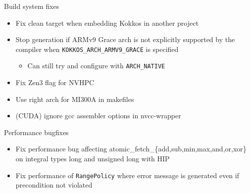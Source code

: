 \begin{frame}[fragile]{Build system fixes}
  \begin{itemize}
      \item Fix clean target when embedding Kokkos in another project
      \item Stop generation if ARMv9 Grace arch is not explicitly supported by the compiler when \texttt{KOKKOS\_ARCH\_ARMV9\_GRACE} is specified
      \begin{itemize}
        \item Can still try and configure with \texttt{ARCH\_NATIVE}
      \end{itemize}
      \item Fix Zen3 flag for NVHPC
      \item Use right arch for MI300A in makefiles
      \item (CUDA) ignore gcc assembler options in nvcc-wrapper
  \end{itemize}
 \end{frame}

\begin{frame}[fragile]{Performance bugfixes}
 \begin{itemize}
     \item Fix performance bug affecting atomic\_fetch\_\{add,sub,min,max,and,or,xor\} on integral types long and unsigned long with HIP
     \item Fix performance of \texttt{RangePolicy} where error message is generated even if precondition not violated
 \end{itemize}
\end{frame}




